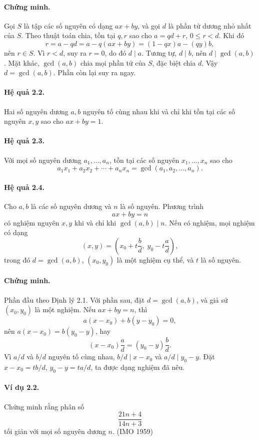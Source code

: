 \documentclass[11pt]{article}
\begin{document}
\paragraph{Chứng minh.}
Gọi \(S\) là tập các số nguyên có dạng \(ax+by\), và gọi \(d\) là phần tử
dương nhỏ nhất của \(S\). Theo thuật toán chia, tồn tại \(q,r\) sao cho
\(a=qd+r\), \(0\le r<d\). Khi đó
\[
 r=a-qd=a-q(ax+by)=(1-qx)a-(qy)b,
\]
nên \(r\in S\). Vì \(r<d\), suy ra \(r=0\), do đó \(d\mid a\). Tương tự,
\(d\mid b\), nên \(d\mid\gcd(a,b)\). Mặt khác, \(\gcd(a,b)\) chia mọi phần tử
của \(S\), đặc biệt chia \(d\). Vậy \(d=\gcd(a,b)\). Phần còn lại suy ra ngay.

\paragraph{Hệ quả 2.2.}
Hai số nguyên dương \(a,b\) nguyên tố cùng nhau khi và chỉ khi tồn tại các số
nguyên \(x,y\) sao cho \(ax+by=1\).

\paragraph{Hệ quả 2.3.}
Với mọi số nguyên dương \(a_1,\ldots,a_n\), tồn tại các số nguyên
\(x_1,\ldots,x_n\) sao cho
\[
 a_1x_1+a_2x_2+\cdots+a_nx_n=\gcd(a_1,a_2,\ldots,a_n).
\]

\paragraph{Hệ quả 2.4.}
Cho \(a,b\) là các số nguyên dương và \(n\) là số nguyên. Phương trình
\[
 ax+by=n
\]
có nghiệm nguyên \(x,y\) khi và chỉ khi \(\gcd(a,b)\mid n\). Nếu có nghiệm,
mọi nghiệm có dạng
\[
 (x,y)=\left(x_0+t\frac bd,\;y_0-t\frac ad\right),
\]
trong đó \(d=\gcd(a,b)\), \((x_0,y_0)\) là một nghiệm cụ thể, và \(t\) là số
nguyên.

\paragraph{Chứng minh.}
Phần đầu theo Định lý 2.1. Với phần sau, đặt \(d=\gcd(a,b)\), và giả sử
\((x_0,y_0)\) là một nghiệm. Nếu \(ax+by=n\), thì
\[
 a(x-x_0)+b(y-y_0)=0,
\]
nên \(a(x-x_0)=b(y_0-y)\), hay
\[
 (x-x_0)\frac ad=(y_0-y)\frac bd.
\]
Vì \(a/d\) và \(b/d\) nguyên tố cùng nhau, \(b/d\mid x-x_0\) và
\(a/d\mid y_0-y\). Đặt \(x-x_0=tb/d\), \(y_0-y=ta/d\), ta được dạng nghiệm đã
nêu.

\paragraph{Ví dụ 2.2.}
Chứng minh rằng phân số
\[
 \frac{21n+4}{14n+3}
\]
tối giản với mọi số nguyên dương \(n\). (IMO 1959)
\end{document}
